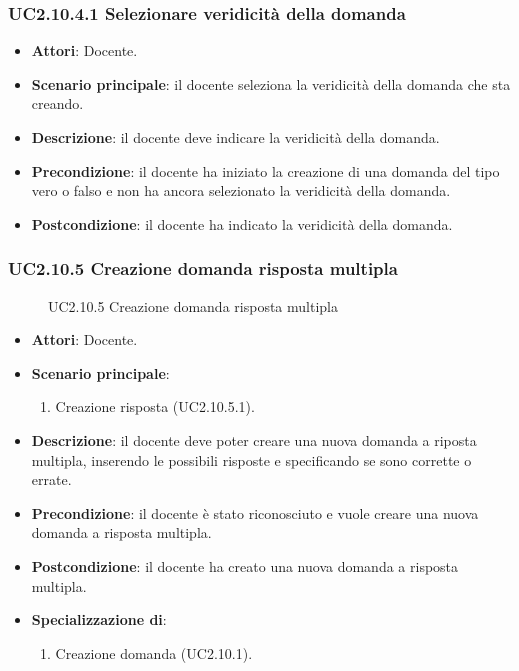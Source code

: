 \subsubsection{UC2.10.4.1 Selezionare veridicità della domanda}
\begin{itemize}
\item \textbf{Attori}: Docente.
\item \textbf{Scenario principale}: il docente seleziona la veridicità della domanda che sta creando.
\item \textbf{Descrizione}: il docente deve indicare la veridicità della domanda.
\item \textbf{Precondizione}: il docente ha iniziato la creazione di una domanda del tipo vero o falso e non ha ancora selezionato la veridicità della domanda.
\item \textbf{Postcondizione}: il docente ha indicato la veridicità della domanda.
\end{itemize}
\subsubsection{UC2.10.5 Creazione domanda risposta multipla}
\begin{figure}[H]
\centering
\noindent{}
\caption{UC2.10.5 Creazione domanda risposta multipla}
\end{figure}
\begin{itemize}
\item \textbf{Attori}: Docente.
\item \textbf{Scenario principale}:
\begin{enumerate}
\item Creazione risposta (UC2.10.5.1).
\end{enumerate}
\item \textbf{Descrizione}: il docente deve poter creare una nuova domanda a riposta multipla, inserendo le possibili risposte e specificando se sono corrette o errate.
\item \textbf{Precondizione}: il docente è stato riconosciuto e vuole creare una nuova domanda a risposta multipla.
\item \textbf{Postcondizione}: il docente ha creato una nuova domanda a risposta multipla.
\item \textbf{Specializzazione di}:
\begin{enumerate}
\item Creazione domanda (UC2.10.1).
\end{enumerate}
\end{itemize}
